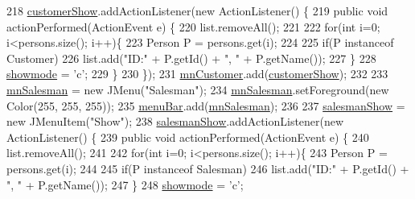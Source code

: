 \begin{DoxyCode}
218         \hyperlink{classpkg_1_1_management_u_i_ada892716bd590c607273c9a9b5353d03}{customerShow}.addActionListener(\textcolor{keyword}{new} ActionListener() \{
219             \textcolor{keyword}{public} \textcolor{keywordtype}{void} actionPerformed(ActionEvent e) \{
220                 list.removeAll();
221                 
222                 \textcolor{keywordflow}{for}(\textcolor{keywordtype}{int} i=0; i<persons.size(); i++)\{
223                     Person P = persons.get(i);
224                     
225                     \textcolor{keywordflow}{if}(P instanceof Customer)
226                         list.add(\textcolor{stringliteral}{"ID:"} + P.getId() + \textcolor{stringliteral}{", "} + P.getName());
227                 \}
228                 \hyperlink{classpkg_1_1_management_u_i_a06db2befb99ab3b189caa39e736e2d0d}{showmode} = \textcolor{charliteral}{'c'};
229             \}
230         \});
231         \hyperlink{classpkg_1_1_management_u_i_a0c7fb8ff1b3734316fe7bc49221a5814}{mnCustomer}.add(\hyperlink{classpkg_1_1_management_u_i_ada892716bd590c607273c9a9b5353d03}{customerShow});
232         
233         \hyperlink{classpkg_1_1_management_u_i_a240bf0c46a930b09db9d727ce86c6ec7}{mnSalesman} = \textcolor{keyword}{new} JMenu(\textcolor{stringliteral}{"Salesman"});
234         \hyperlink{classpkg_1_1_management_u_i_a240bf0c46a930b09db9d727ce86c6ec7}{mnSalesman}.setForeground(\textcolor{keyword}{new} Color(255, 255, 255));
235         \hyperlink{classpkg_1_1_management_u_i_ace9ff91bcebb641b7363e764eae00310}{menuBar}.add(\hyperlink{classpkg_1_1_management_u_i_a240bf0c46a930b09db9d727ce86c6ec7}{mnSalesman});
236         
237         \hyperlink{classpkg_1_1_management_u_i_ad1d6b0d565e4379362dbb7f4071614a9}{salesmanShow} = \textcolor{keyword}{new} JMenuItem(\textcolor{stringliteral}{"Show"});
238         \hyperlink{classpkg_1_1_management_u_i_ad1d6b0d565e4379362dbb7f4071614a9}{salesmanShow}.addActionListener(\textcolor{keyword}{new} ActionListener() \{
239             \textcolor{keyword}{public} \textcolor{keywordtype}{void} actionPerformed(ActionEvent e) \{
240                 list.removeAll();
241                 
242                 \textcolor{keywordflow}{for}(\textcolor{keywordtype}{int} i=0; i<persons.size(); i++)\{
243                     Person P = persons.get(i);
244                     
245                     \textcolor{keywordflow}{if}(P instanceof Salesman)
246                         list.add(\textcolor{stringliteral}{"ID:"} + P.getId() + \textcolor{stringliteral}{", "} + P.getName());
247                 \}
248                 \hyperlink{classpkg_1_1_management_u_i_a06db2befb99ab3b189caa39e736e2d0d}{showmode} = \textcolor{charliteral}{'c'};

\end{DoxyCode}
